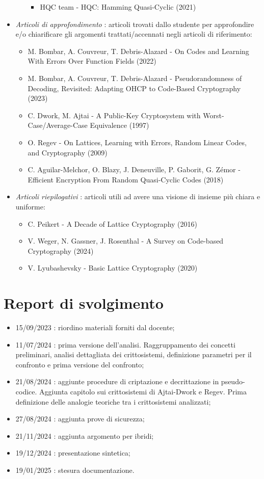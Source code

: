 \documentclass[12pt, a4paper]{report}
\theoremstyle{definition}
\begin{document}
\begin{itemize}
\begin{itemize}
\begin{itemize}
								\item HQC team - HQC: Hamming Quasi-Cyclic (2021)
							\end{itemize}
					\end{itemize}
				\item \emph{Articoli di approfondimento} : articoli trovati dallo studente per approfondire e/o chiarificare gli argomenti trattati/accennati negli articoli di riferimento:
					\begin{itemize}
						\item M. Bombar, A. Couvreur, T. Debris-Alazard - On Codes and Learning With Errors Over
						Function Fields (2022)
						\item M. Bombar, A. Couvreur, T. Debris-Alazard - Pseudorandomness of Decoding, Revisited:
						Adapting OHCP to Code-Based Cryptography (2023)
						\item C. Dwork, M. Ajtai - A Public-Key Cryptosystem with Worst-Case/Average-Case 
						Equivalence (1997)
						\item O. Regev - On Lattices, Learning with Errors, Random Linear Codes, and Cryptography (2009)
						\item C. Aguilar-Melchor, O. Blazy, J. Deneuville, P. Gaborit, G. Zémor - Efficient Encryption
						From Random Quasi-Cyclic Codes (2018)
					\end{itemize}
				\item \emph{Articoli riepilogativi} : articoli utili ad avere una visione di insieme più chiara e uniforme:
					\begin{itemize}
						\item C. Peikert - A Decade of Lattice Cryptography (2016)
						\item V. Weger, N. Gassner, J. Rosenthal - A Survey on Code-based Cryptography (2024)
						\item V. Lyubashevsky - Basic Lattice Cryptography (2020)
					\end{itemize}
			\end{itemize}
	\chapter{Report di svolgimento}
		\begin{itemize}
			\item 15/09/2023 : riordino materiali forniti dal docente;
			\item 11/07/2024 : prima versione dell'analisi. Raggruppamento dei concetti preliminari, analisi dettagliata dei crittosistemi, definizione parametri per il confronto e prima versione del confronto;
			\item 21/08/2024 : aggiunte procedure di criptazione e decrittazione in pseudo-codice. Aggiunta capitolo sui crittosistemi di Ajtai-Dwork e Regev. Prima definizione delle analogie teoriche tra i crittosistemi analizzati;
			\item 27/08/2024 : aggiunta prove di sicurezza;
			\item 21/11/2024 : aggiunta argomento per ibridi;
			\item 19/12/2024 : presentazione sintetica;
			\item 19/01/2025 : stesura documentazione.
		\end{itemize}
\end{document}
